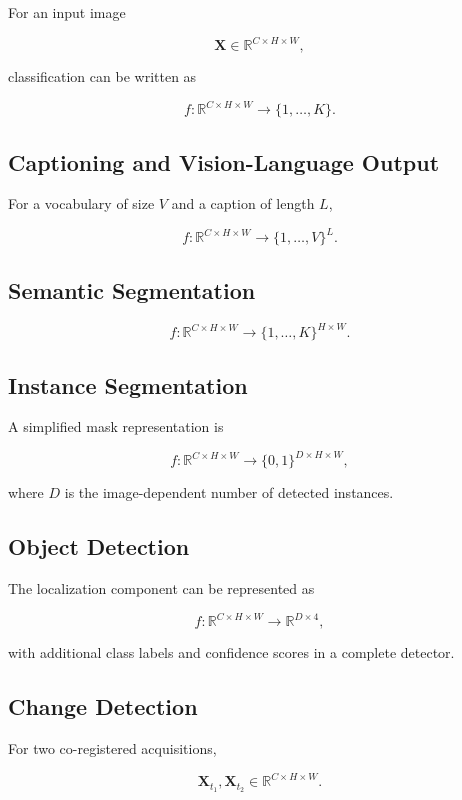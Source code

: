 \documentclass[
    11pt,
    a4paper,
    parskip=half,
    bibliography=totoc,
    numbers=noenddot
]{scrartcl}
\begin{document}
For an input image

\[
\mathbf{X}\in\mathbb{R}^{C\times H\times W},
\]

classification can be written as

\[
f:
\mathbb{R}^{C\times H\times W}
\rightarrow
\{1,\ldots,K\}.
\]

\subsection{Captioning and Vision-Language Output}

For a vocabulary of size \(V\) and a caption of length \(L\),

\[
f:
\mathbb{R}^{C\times H\times W}
\rightarrow
\{1,\ldots,V\}^{L}.
\]

\subsection{Semantic Segmentation}

\[
f:
\mathbb{R}^{C\times H\times W}
\rightarrow
\{1,\ldots,K\}^{H\times W}.
\]

\subsection{Instance Segmentation}

A simplified mask representation is

\[
f:
\mathbb{R}^{C\times H\times W}
\rightarrow
\{0,1\}^{D\times H\times W},
\]

where \(D\) is the image-dependent number of detected instances.

\subsection{Object Detection}

The localization component can be represented as

\[
f:
\mathbb{R}^{C\times H\times W}
\rightarrow
\mathbb{R}^{D\times 4},
\]

with additional class labels and confidence scores in a complete detector.

\subsection{Change Detection}

For two co-registered acquisitions,

\[
\mathbf{X}_{t_1},\mathbf{X}_{t_2}
\in
\mathbb{R}^{C\times H\times W}.
\]
\end{document}
